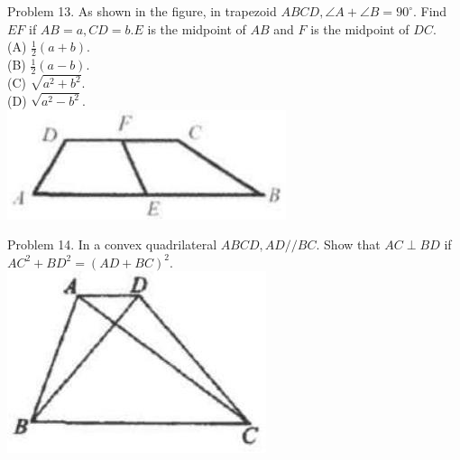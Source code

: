 \documentclass[10pt]{article}
\begin{document}
Problem 13. As shown in the figure, in trapezoid \(A B C D, \angle A+\angle B=90^{\circ}\). Find \(E F\) if \(A B=a, C D=b . E\) is the midpoint of \(A B\) and \(F\) is the midpoint of \(D C\).\\
(A) \(\frac{1}{2}(a+b)\).\\
(B) \(\frac{1}{2}(a-b)\).\\
(C) \(\sqrt{a^{2}+b^{2}}\).\\
(D) \(\sqrt{a^{2}-b^{2}}\).\\
\includegraphics[max width=\textwidth, center]{2025_04_17_97bc1f7e44d93c271a88g-128(4)}

Problem 14. In a convex quadrilateral \(A B C D, A D / / B C\). Show that \(A C \perp B D\) if \(A C^{2}+B D^{2}=(A D+B C)^{2}\).\\
\includegraphics[max width=\textwidth, center]{2025_04_17_97bc1f7e44d93c271a88g-128(3)}
\end{document}
